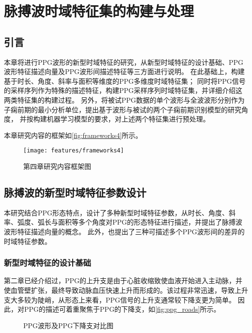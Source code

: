 \chapter{脉搏波时域特征集的构建与处理}
\section{引言}
本章将进行PPG波形的新型时域特征的研究，从新型时域特征的设计基础、PPG波形特征描述向量及PPG波形间描述特征等三方面进行说明。
在此基础上，构建基于时长、角度、斜率与面积等维度的PPG多维度时域特征集；
同时将PPG信号的采样序列作为特殊的描述特征，构建PPG采样序列时域特征集，并详细介绍这两类特征集的构建过程。
另外，将被试PPG数据的单个波形与全波波形分别作为子痫前期的最小分析单位，提出基于波形与被试的两个子痫前期识别模型的研究角度，
并按构建机器学习模型的要求，对上述两个特征集进行预处理。

本章研究内容的框架如\autoref{fig:frameworks4}所示。

\begin{figure}[htbp]
  \centering
  \texttt{[image: features/frameworks4]}
  \caption{\label{fig:frameworks4}第四章研究内容框架图}
\end{figure}

\section{脉搏波的新型时域特征参数设计}
本研究结合PPG形态特点，设计了多种新型时域特征参数，从时长、角度、斜率、弧度、弧长与面积等多个角度对PPG的形态特征进行描述，并提出了脉搏波波形特征描述向量的概念。
此外，也提出了三种可描述多个PPG波形间的差异的时域特征参数。

\subsection{新型时域特征的设计基础}

第二章已经介绍过，PPG的上升支是由于心脏收缩致使血液开始进入主动脉，并使血管壁扩张，最终导致动脉血压快速上升而形成的\cite{PPGYY}。该过程非常迅速，导致上升支大多较为陡峭，从形态上来看，PPG信号的上升支通常较下降支更为简单\cite{PPGYY,Chen2021}。
因此，对PPG的描述可着重聚焦于PPG的下降支，如\autoref{fig:ppg_roads}所示。
\begin{figure}[htbp]
  \centering
  \quad
  \caption{\label{fig:ppg_roads}PPG波形及PPG下降支对比图}
\end{figure}

